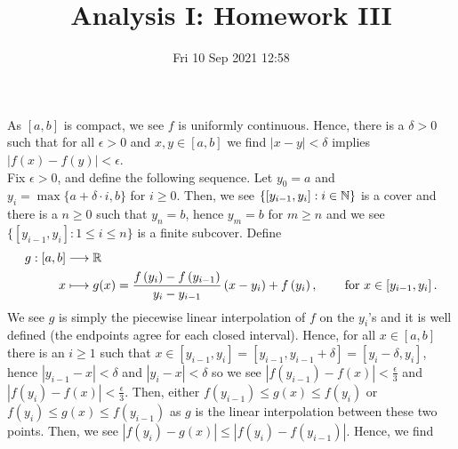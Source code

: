 \documentclass[a4paper]{article}
\title{Analysis I: Homework III}
\date{Fri 10 Sep 2021 12:58}
\begin{document}
\maketitle
\begin{solution}[17]
\end{solution}
\newpage

\begin{solution}[18]
	As \(\left[ a, b \right] \) is compact, we see \(f\) is uniformly continuous. Hence, there is a \(\delta > 0\) such that for all \(\epsilon > 0\) and \(x, y \in \left[ a, b \right] \) we find \(\left| x - y \right| < \delta\)  implies \(\left| f\left( x \right)  - f\left( y \right)  \right|  < \epsilon\).\\
	Fix \(\epsilon > 0\), and  define the following sequence. Let \(y_0 = a\) and \(y_{i} = \max \{a + \delta  \cdot i, b\}\) for \(i \ge 0\). Then, we see \(\{\left[ y_{i-1}, y_{i } \right] : i \in \mathbb{N}\} \) is a cover and there is a \(n \ge 0\)  such that \(y_{n} = b\), hence \(y_{m} = b\) for \(m \ge n\) and we see \(\{\left[ y_{i-1}, y_{i} \right] : 1 \le i \le n\} \) is a finite subcover. Define \begin{align*}
		g: \left[ a, b \right]  &\longrightarrow \mathbb{R} \\
		x &\longmapsto g(x) =
				\frac{f\left( y_{i} \right) - f\left( y_{i-1} \right) }{y_{i} - y_{i-1}} \left( x - y_{i} \right) + f\left( y_{i} \right)   , & \quad \text{ for } x \in \left[ y_{i-1}, y_{i} \right]
	.\end{align*}
	We see \(g\) is simply the piecewise linear interpolation of \(f\) on the \(y_{i}\)'s and it is well defined (the endpoints agree for each closed interval). Hence, for all \(x \in \left[ a, b \right] \) there is an \(i\ge 1\) such that \(x \in \left[ y_{i-1}, y_{i} \right]  = \left[ y_{i-1}, y_{i-1} + \delta \right] = \left[ y_{i} - \delta, y_{i} \right]  \), hence \(\left| y_{i-1} - x \right| < \delta\) and \(\left| y_{i} - x \right| < \delta\)  so we see \(\left| f \left( y_{i-1} \right)  - f\left( x \right)  \right| < \frac{\epsilon}{3} \) and \(\left| f\left( y_{i} \right) - f\left( x \right)  \right| < \frac{\epsilon}{3}\). Then, either \(f\left( y_{i-1} \right) \le g\left( x \right) \le f\left( y_{i} \right) \) or \(f\left( y_{i} \right) \le g\left( x \right) \le f\left( y_{i-1} \right) \) as \(g\) is the linear interpolation between these two points. Then, we see \(\left| f\left( y_{i} \right)  - g\left( x \right)  \right| \le \left| f\left( y_{i} \right)  - f\left( y_{i-1} \right)  \right| \). Hence, we find
	\begin{align*}

\end{align*}
\end{solution}
\end{document}
